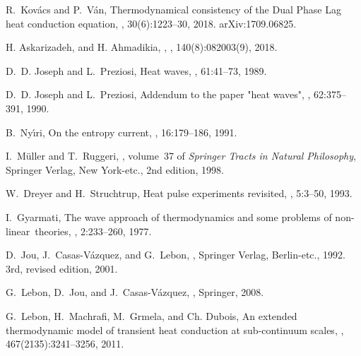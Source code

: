 \documentclass[sn-mathphys]{sn-jnl}%
\theoremstyle{thmstyleone}%
\theoremstyle{thmstyletwo}%
\theoremstyle{thmstylethree}%
\begin{document}
\begin{thebibliography}{9}
	R.~Kov\'acs and P.~V\'an,
	\newblock Thermodynamical consistency of the {Dual Phase Lag} heat conduction
	equation,
	, 30(6):1223--30, 2018.
	\newblock arXiv:1709.06825.	
	
	\newblock H. Askarizadeh, and H. Ahmadikia,
	,
	, 140(8):082003(9), 2018.			
	
	D.~D. Joseph and L.~Preziosi,
	\newblock Heat waves,
	, 61:41--73, 1989.
	
	D.~D. Joseph and L.~Preziosi,
	\newblock Addendum to the paper "heat waves",
	, 62:375--391, 1990.
	
	B.~Ny\'\i{}ri,
	\newblock On the entropy current,
	, 16:179--186, 1991.
	
	I.~M\"uller and T.~Ruggeri,
	, volume~37 of {\em Springer
		Tracts in Natural Philosophy},
	\newblock Springer Verlag, New York-etc., 2nd edition, 1998.
	
	W.~Dreyer and H.~Struchtrup,
	\newblock Heat pulse experiments revisited,
	, 5:3--50, 1993.
	
	I.~Gyarmati,
	\newblock The wave approach of thermodynamics and some problems of non-linear theories,
	, 2:233--260, 1977.
	
	D.~Jou, J.~Casas-V\'azquez, and G.~Lebon,
	,
	\newblock Springer Verlag, Berlin-etc., 1992.
	\newblock 3rd, revised edition, 2001.
	
	G.~Lebon, D.~Jou, and J.~Casas-V{\'a}zquez,
	,
	\newblock Springer, 2008.
	
	G.~Lebon, H.~Machrafi, M.~Grmela, and Ch. Dubois,
	\newblock An extended thermodynamic model of transient heat conduction at sub-continuum scales,
	, 467(2135):3241--3256, 2011.
	

\end{thebibliography}
\end{document}
